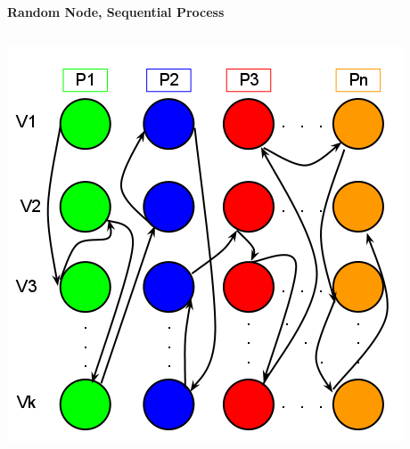 \documentclass[final]{beamer}
\begin{document}
\begin{frame}[t]
\begin{columns}[t]
\begin{column}{0.60\paperwidth}
\begin{columns}[t,totalwidth=0.60\paperwidth]
\begin{column}{0.28\paperwidth}
\begin{columns}[t,totalwidth=0.28\paperwidth]
\begin{column}{0.12\paperwidth}
							\end{column}
						\end{columns}
					\end{column}
				\end{columns}
				\begin{columns}[t,totalwidth=0.60\paperwidth]
					\begin{column}{0.28\paperwidth}
						\begin{center} \bf{Random Node, Sequential Process} \end{center}
						\begin{columns}[t,totalwidth=0.28\paperwidth]
							\begin{column}{0.12\paperwidth}
								\begin{center} \includegraphics[width=0.12\paperwidth]{img/linked_list/rand_node_seq_proc} \end{center}
							\end{column}
							\begin{column}{0.12\paperwidth}

\end{column}
\end{columns}
\end{column}
\end{columns}
\end{column}
\end{columns}
\end{frame}
\end{document}
